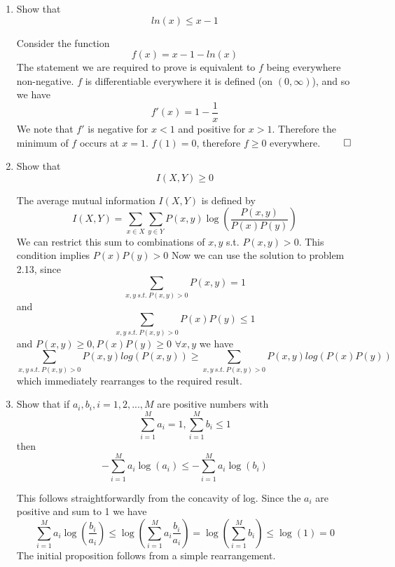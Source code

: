 \documentclass{article}
\newcommand{\chapternumber}{2}
\newenvironment{QandA}{\begin{enumerate}[label=\chapternumber.\arabic*]\bfseries\boldmath}
	{\end{enumerate}}
\newenvironment{answered}{\par\bigskip\normalfont\unboldmath}{}
\begin{document}
\begin{QandA}
	\item Show that 
	\[ln(x)\leq x-1\]
	\begin{answered}
		Consider the function \[f(x)=x-1-ln(x)\]The statement we are required to prove is equivalent to $f$ being everywhere non-negative. $f$ is differentiable everywhere it is defined (on $(0,\infty)$), and so we have
		\[f'(x)=1-\frac{1}{x}\]
		We note that $f'$ is negative for $x<1$ and positive for $x>1$. Therefore the minimum of $f$ occurs at $x=1$. $f(1)=0$, therefore $f\geq0$ everywhere. $\qed$		
	\end{answered}

	\item Show that 
	\[I(X,Y)\geq 0\]
	\begin{answered}
		The average mutual information $I(X,Y)$ is defined by
		\[I(X,Y)=\sum_{x\in X}\sum_{y\in Y}P(x,y)\log\left(\frac{P(x,y)}{P(x)P(y)}\right)\]
		We can restrict this sum to combinations of $x,y$ s.t. $P(x,y)>0$. This condition implies $P(x)P(y)>0$
		Now we can use the solution to problem 2.13, since 
		\[\sum_{x,y\ s.t.\ P(x,y)>0}P(x,y)=1\]
		and
		\[\sum_{x,y\ s.t.\ P(x,y)>0}P(x)P(y)\leq1\]
		and $P(x,y)\geq 0,P(x)P(y)\geq0$ $\forall x,y$
		we have
		\[\sum_{x,y\ s.t.\ P(x,y)>0}P(x,y)log(P(x,y))\geq \sum_{x,y\ s.t.\ P(x,y)>0}P(x,y)log(P(x)P(y))\]
		which immediately rearranges to the required result.
	\end{answered}

	\item Show that if $a_i,b_i,i=1,2,...,M$ are positive numbers with
	\[\sum_{i=1}^Ma_i=1,\sum_{i=1}^Mb_i\leq1\]
	then
	\[-\sum_{i=1}^Ma_i\log(a_i)\leq-\sum_{i=1}^Ma_i\log(b_i)\]
	\begin{answered}
		This follows straightforwardly from the concavity of log. Since the $a_i$ are positive and sum to 1 we have
	\[\sum_{i=1}^Ma_i\log\left(\frac{b_i}{a_i}\right)\leq \log\left(\sum_{i=1}^Ma_i\frac{b_i}{a_i}\right)=\log\left(\sum_{i=1}^Mb_i\right)\leq \log(1)=0\]
	The initial proposition follows from a simple rearrangement.
	\end{answered}



\end{QandA}
\end{document}
